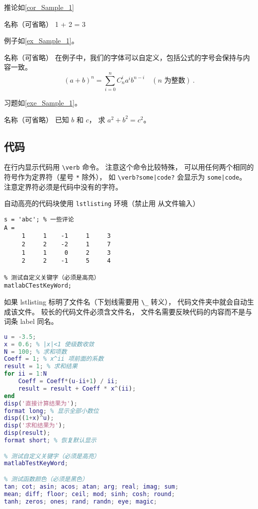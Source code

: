 推论如\autoref{cor_Sample_1}
\begin{corollary}{名称（可省略）}\label{cor_Sample_1}
1 + 2 = 3
\end{corollary}

例子如\autoref{ex_Sample_1}。 
\begin{example}{名称（可省略）}\label{ex_Sample_1}
在例子中，我们的字体可以自定义，包括公式的字号会保持与内容一致。
\begin{equation}
(a+b)^n = \sum_{i=0}^n C_n^i a^i b^{n-i} \quad (\text{$n$ 为整数})~.
\end{equation}
\end{example}

习题如\autoref{exe_Sample_1}。 
\begin{exercise}{名称（可省略）}\label{exe_Sample_1}
已知 $b$ 和 $c$， 求 $a^2 + b^2 = c^2$。
\end{exercise}

\subsection{代码}
在行内显示代码用 \verb|\verb| 命令。 注意这个命令比较特殊， 可以用任何两个相同的符号作为定界符（星号 \verb|*| 除外）， 如 \verb+\verb?some|code?+ 会显示为 \verb?some|code?。 注意定界符必须是代码中没有的字符。

自动高亮的代码块使用 \verb|lstlisting| 环境（禁止用 \verb|| 从文件输入）
\begin{lstlisting}[language=matlabC]
s = 'abc'; % 一些评论
A =
     1     1    -1     1     3
     2     2    -2     1     7
     1     1     0     2     3
     2     2    -1     5     4

% 测试自定义关键字（必须是高亮）
matlabCTestKeyWord;
\end{lstlisting}

如果 lstlisting 标明了文件名（下划线需要用 \verb|\_| 转义）， 代码文件夹中就会自动生成该文件。 较长的代码文件必须含文件名， 文件名需要反映代码的内容而不是与词条 label 同名。

\begin{lstlisting}[language=matlab, caption=sample\_code.m]
% 验证二项式定理(非整数幂)
u = -3.5;
x = 0.6; % |x|<1 使级数收敛
N = 100; % 求和项数
Coeff = 1; % x^ii 项前面的系数
result = 1; % 求和结果
for ii = 1:N
    Coeff = Coeff*(u-ii+1) / ii;
    result = result + Coeff * x^(ii);
end
disp('直接计算结果为');
format long; % 显示全部小数位
disp((1+x)^u);
disp('求和结果为');
disp(result);
format short; % 恢复默认显示

% 测试自定义关键字（必须是高亮）
matlabTestKeyWord;

% 测试函数颜色（必须是黑色）
tan; cot; asin; acos; atan; arg; real; imag; sum;
mean; diff; floor; ceil; mod; sinh; cosh; round;
tanh; zeros; ones; rand; randn; eye; magic;
\end{lstlisting}

